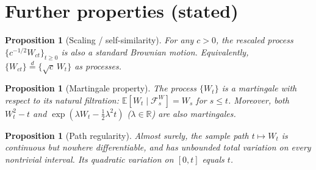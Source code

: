 \documentclass[11pt]{article}
\newtheorem{proposition}[theorem]{Proposition}
\theoremstyle{definition}
\theoremstyle{remark}
\newcommand{\R}{\mathbb{R}}
\newcommand{\E}{\mathbb{E}}
\newcommand{\F}{\mathcal{F}}
\begin{document}
\section{Further properties (stated)}

\begin{proposition}[Scaling / self-similarity]
For any $c > 0$, the rescaled process $\{c^{-1/2} W_{ct}\}_{t \geq 0}$ is
also a standard Brownian motion. Equivalently,
$\{W_{ct}\} \stackrel{d}{=} \{\sqrt{c}\, W_t\}$ as processes.
\end{proposition}

\begin{proposition}[Martingale property]
The process $\{W_t\}$ is a martingale with respect to its natural
filtration: $\E[W_t \mid \F_s^W] = W_s$ for $s \leq t$. Moreover, both
$W_t^2 - t$ and $\exp(\lambda W_t - \tfrac{1}{2}\lambda^2 t)$
($\lambda \in \R$) are also martingales.
\end{proposition}

\begin{proposition}[Path regularity]
Almost surely, the sample path $t \mapsto W_t$ is continuous but nowhere
differentiable, and has unbounded total variation on every nontrivial
interval. Its quadratic variation on $[0,t]$ equals $t$.
\end{proposition}
\end{document}
